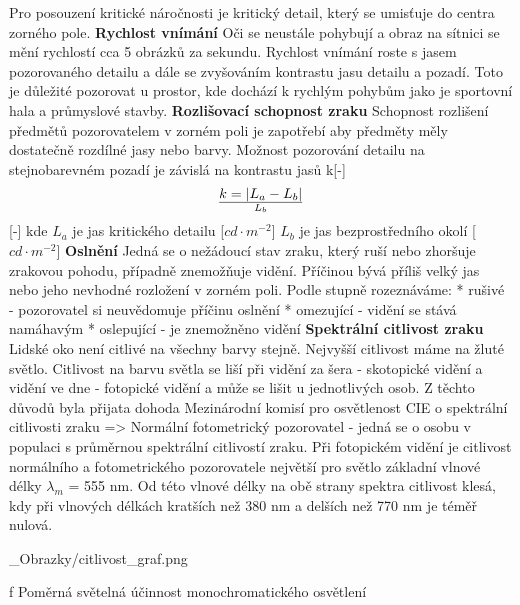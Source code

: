 Pro posouzení kritické náročnosti je kritický detail, který se umisťuje do centra zorného pole.
\medskip
{\bf Rychlost vnímání}
\medskip
Oči se neustále pohybují a obraz na sítnici se mění rychlostí cca 5 obrázků za sekundu. Rychlost vnímání roste s jasem pozorovaného detailu a dále se zvyšováním kontrastu jasu detailu a pozadí. Toto je důležité pozorovat u prostor, kde dochází k rychlým pohybům jako je sportovní hala a průmyslové stavby.
{\bf Rozlišovací schopnost zraku}
\medskip
Schopnost rozlišení předmětů pozorovatelem v zorném poli je zapotřebí aby předměty měly dostatečně rozdílné jasy nebo barvy. Možnost pozorování detailu na stejnobarevném pozadí je závislá na kontrastu jasů k[-]
$$k={|L_a-L_b|}\over L_b$$ [-]
kde  $L_a$ je jas kritického detailu [$cd \cdot m^{-2}$]
\medskip
$L_b$ je jas bezprostředního okolí [$cd \cdot m^{-2}$]
\medskip
{\bf Oslnění} 
\medskip
Jedná se o nežádoucí stav zraku, který ruší nebo zhoršuje zrakovou pohodu, případně znemožňuje vidění. Příčinou bývá příliš velký jas nebo jeho nevhodné rozložení v zorném poli.
Podle stupně rozeznáváme:
\medskip
\begitems
* rušivé - pozorovatel si neuvědomuje příčinu oslnění
* omezující - vidění se stává namáhavým
* oslepující - je znemožněno vidění
\enditems
\medskip
{\bf Spektrální citlivost zraku}
\medskip
Lidské oko není citlivé na všechny barvy stejně. Nejvyšší citlivost máme na žluté světlo. Citlivost na barvu světla se liší při vidění za šera - skotopické vidění a vidění ve dne - fotopické vidění a může se lišit u jednotlivých osob. Z těchto důvodů byla přijata dohoda Mezinárodní komisí pro osvětlenost CIE o  spektrální citlivosti zraku => {\sbf Normální fotometrický pozorovatel} - jedná se o osobu v populaci s průměrnou spektrální citlivostí zraku. Při fotopickém vidění je citlivost normálního a fotometrického pozorovatele největší pro světlo základní vlnové délky $λ_m$ = 555 nm. Od této vlnové délky na obě strany spektra citlivost klesá, kdy při vlnových délkách kratších než 380 nm a delších než 770 nm je téměř nulová. 
\medskip

\medskip {}
\picw=12cm _Obrazky/citlivost_graf.png
\caption/f Poměrná světelná účinnost monochromatického osvětlení


